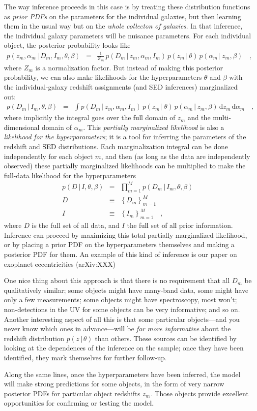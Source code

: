 \documentclass[12pt]{article}
\newcommand{\given}{\,|\,}
\newcommand{\dd}{\mathrm d}
\begin{document}
The way inference proceeds in this case is by treating these
distribution functions as \emph{prior PDFs} on the parameters for the
individual galaxies, but then learning them in the usual way but on
the \emph{whole collecton of galaxies}.  In that inference, the
individual galaxy parameters will be nuisance parameters.  For each
individual object, the posterior probability looks like
\begin{eqnarray}\displaystyle
p(z_m, \alpha_m \given D_m, I_m, \theta, \beta) &=&
  \frac{1}{Z_m}\,p(D_m \given z_m, \alpha_m, I_m)
  \,p(z_m \given \theta)\,p(\alpha_m \given z_m, \beta)
\quad ,
\end{eqnarray}
where $Z_m$ is a normalization factor.  But instead of making this
posterior probability, we can also make likelihoods for the
hyperparameters $\theta$ and $\beta$ with the individual-galaxy
redshift assignments (and SED inferences) marginalized out:
\begin{eqnarray}\displaystyle
p(D_m \given I_m, \theta, \beta) &=&
  \int p(D_m \given z_m, \alpha_m, I_m)
  \,p(z_m \given \theta)\,p(\alpha_m \given z_m, \beta)\,\dd z_m\,\dd\alpha_m
\quad ,
\end{eqnarray}
where implicitly the integral goes over the full domain of $z_m$ and
the multi-dimensional domain of $\alpha_m$.  This \emph{partially
  marginalized likelihood} is also a \emph{likelihood for the
  hyperparameters}; it is a tool for inferring the parameters of the
redshift and SED distributions.  Each marginalization integral can be
done independently for each object $m$, and then (as long as the data
are independently observed) these partially marginalized likelihoods
can be multiplied to make the full-data likelihood for the
hyperparameters
\begin{eqnarray}\displaystyle
p(D \given I, \theta, \beta) &=&
  \prod_{m=1}^M p(D_m \given I_m, \theta, \beta)
\\
D &\equiv& \left\{D_m\right\}_{m=1}^M
\\
I &\equiv& \left\{I_m\right\}_{m=1}^M
\quad ,
\end{eqnarray}
where $D$ is the full set of all data, and $I$ the full set of all
prior information.  Inference can proceed by maximizing this total
partially marginalized likelihood, or by placing a prior PDF on the
hyperparameters themselves and making a posterior PDF for them.  An
example of this kind of inference is our paper on exoplanet
eccentricities (arXiv:XXX)

One nice thing about this approach is that there is no requirement
that all $D_m$ be qualitatively similar; some objects might have
many-band data, some might have only a few measurements; some objects
might have spectroscopy, most won't; non-detections in the UV for some
objects can be very informative; and so on.  Another interesting
aspect of all this is that some particular objects---and you never
know which ones in advance---will be \emph{far more informative} about
the redshift distribution $p(z \given \theta)$ than others.  These
sources can be identified by looking at the dependences of the
inference on the sample; once they have been identified, they mark
themselves for further follow-up.

Along the same lines, once the hyperparameters have been inferred, the
model will make strong predictions for some objects, in the form of
very narrow posterior PDFs for particular object redshifts $z_m$.
Those objects provide excellent opportunities for confirming or
testing the model.
\end{document}
